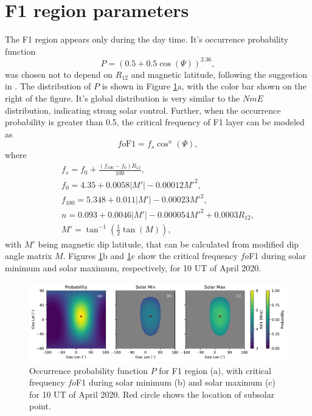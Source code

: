 \documentclass[draft]{agujournal2019}
\begin{document}
\section{F1 region parameters}
The F1 region appears only during the day time. It's occurrence probability function 
\begin{equation}\label{eqn:P}
P=\left(0.5+0.5\cos(\Psi)\right)^{2.36},
\end{equation}
was chosen not to depend on $R_{12}$ and magnetic latitude, following the suggestion in . The distribution of $P$ is shown in Figure \ref{fig:foF1_min_max}a, with the color bar shown on the right of the figure. It's global distribution is very similar to the $NmE$ distribution, indicating strong solar control. Further, when the occurrence probability is greater than 0.5, the critical frequency of F1 layer can be modeled as
\begin{equation}\label{eqn:foF1}
fo\mathrm{F1}=f_s\cos^n(\Psi),
\end{equation}
where
\begin{equation}\label{eqn:foF1_components}
\begin{array}{l}f_s=f_0+\frac{(f_{100}-f_{0})R_{12}}{100}, \\
f_0=4.35+0.0058|M'|-0.00012M'^2, \\
f_{100}=5.348+0.011|M'|-0.00023M'^2, \\
n=0.093+0.0046|M'|-0.000054M'^2+0.0003R_{12}, \\
M'=\tan^{-1}(\frac{1}{2}\tan(M)),
\end{array} 
\end{equation}
with $M'$ being magnetic dip latitude, that can be calculated from modified dip angle matrix $M$.
Figures \ref{fig:foF1_min_max}b and \ref{fig:foF1_min_max}c show the critical frequency $fo$F1 during solar minimum and solar maximum, respectively, for 10 UT of April 2020.

\begin{figure}[H]
  \includegraphics[scale=0.6]{PyIRI_foF1_min_max.pdf}
  \caption{Occurrence probability function $P$ for F1 region (a), with critical frequency $fo$F1 during solar minimum (b) and solar maximum (c) for 10 UT of April 2020. Red circle shows the location of subsolar point.}
  \label{fig:foF1_min_max}
\end{figure}
\end{document}
